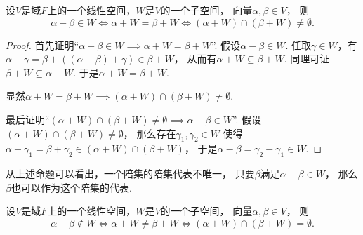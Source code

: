 \begin{theorem}\label{theorem:商空间.子空间相同的两个陪集相等的等价条件}
设\(V\)是域\(F\)上的一个线性空间，\(W\)是\(V\)的一个子空间，
向量\(\alpha,\beta \in V\)，
则\begin{equation*}
	\alpha - \beta \in W
	\iff
	\alpha + W = \beta + W
	\iff
	(\alpha + W) \cap (\beta + W) \neq \emptyset.
\end{equation*}
\begin{proof}
首先证明“\(
	\alpha - \beta \in W
	\implies
	\alpha + W = \beta + W
\)”.
假设\(\alpha - \beta \in W\).
任取\(\gamma \in W\)，有\(
	\alpha + \gamma
	= \beta + ((\alpha - \beta) + \gamma)
	\in \beta + W
\)，
从而有\(\alpha + W \subseteq \beta + W\).
同理可证\(\beta + W \subseteq \alpha + W\).
于是\(\alpha + W = \beta + W\).

显然\(
	\alpha + W = \beta + W
	\implies
	(\alpha + W) \cap (\beta + W) \neq \emptyset
\).

最后证明“\(
	(\alpha + W) \cap (\beta + W) \neq \emptyset
	\implies
	\alpha - \beta \in W
\)”.
假设\((\alpha + W) \cap (\beta + W) \neq \emptyset\)，
那么存在\(\gamma_1,\gamma_2 \in W\)
使得\(\alpha + \gamma_1 = \beta + \gamma_2 \in (\alpha + W) \cap (\beta + W)\)，
于是\(\alpha - \beta = \gamma_2 - \gamma_1 \in W\).
\end{proof}
\end{theorem}
\begin{remark}
从上述命题可以看出，一个陪集的陪集代表不唯一，
只要\(\beta\)满足\(\alpha-\beta \in W\)，
那么\(\beta\)也可以作为这个陪集的代表.
\end{remark}

\begin{corollary}
设\(V\)是域\(F\)上的一个线性空间，\(W\)是\(V\)的一个子空间，
向量\(\alpha,\beta \in V\)，
则\begin{equation*}
	\alpha - \beta \notin W
	\iff
	\alpha + W \neq \beta + W
	\iff
	(\alpha + W) \cap (\beta + W) = \emptyset.
\end{equation*}
\end{corollary}

